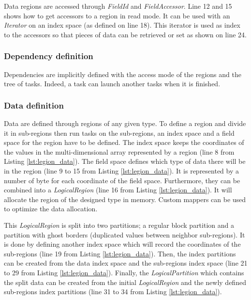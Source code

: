 Data regions are accessed through \textit{FieldId} and \textit{FieldAccessor}.
Line 12 and 15 shows how to get accessors to a region in read mode.
It can be used with an \textit{Iterator} on an index space (as defined on line 18).
This iterator is used as index to the accessors so that pieces of data can be retrieved or set as shown on line 24.


\begin{figure}[t]

\end{figure}

\subsubsection{Dependency definition}
Dependencies are implicitly defined with the access mode of the regions and the tree of tasks.
Indeed, a task can launch another tasks when it is finished.

\subsubsection{Data definition}
Data are defined through regions of any given type.
To define a region and divide it in sub-regions then run tasks on the sub-regions, an index space and a field space for the region have to be defined.
The index space keeps the coordinates of the values in the multi-dimensional array represented by a region (line 8 from Listing \ref{lst:legion_data}).
The field space defines which type of data there will be in the region (line 9 to 15 from Listing \ref{lst:legion_data}).
It is represented by a number of byte for each coordinate of the field space.
Furthermore, they can be combined into a \textit{LogicalRegion}  (line 16 from Listing \ref{lst:legion_data}).
It will allocate the region of the designed type in memory.
Custom mappers can be used to optimize the data allocation.

This \textit{LogicalRegion} is split into two partitions; a regular block partition and a partition with ghost borders (duplicated values between neighbor sub-regions).
It is done by defining another index space which will record the coordinates of the sub-regions (line 19 from Listing \ref{lst:legion_data}).
Then, the index partitions can be created from the data index space and the sub-regions index space (line 21 to 29 from Listing \ref{lst:legion_data}).
Finally, the \textit{LogicalPartition} which contains the split data can be created from the initial \textit{LogicalRegion} and the newly defined sub-regions index partitions (line 31 to 34 from Listing \ref{lst:legion_data}).


